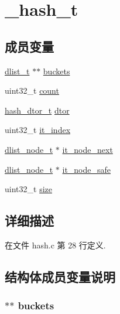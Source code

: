 \hypertarget{struct__hash__t}{}\section{\+\_\+hash\+\_\+t}
\label{struct__hash__t}
\subsection*{成员变量}
\begin{DoxyCompactItemize}
\item 
\hyperlink{config_8h_ad6644d67df4b4e3596c1eb12977d1d16}{dlist\+\_\+t} $\ast$$\ast$ \hyperlink{struct__hash__t_af6b48dd48b7299b532508d86de5dd4d2}{buckets}
\item 
uint32\+\_\+t \hyperlink{struct__hash__t_a86988a65e0d3ece7990c032c159786d6}{count}
\item 
\hyperlink{config_8h_a5dcd1ed9242185e4448352748e58573d}{hash\+\_\+dtor\+\_\+t} \hyperlink{struct__hash__t_a1d83dcf7c1891a605ea334819ac644fb}{dtor}
\item 
uint32\+\_\+t \hyperlink{struct__hash__t_a028bed28cdb43f02ee8bb330d2cc5653}{it\+\_\+index}
\item 
\hyperlink{config_8h_a62053232bcf3566010ef98a7d77c3cc8}{dlist\+\_\+node\+\_\+t} $\ast$ \hyperlink{struct__hash__t_a177625c1a4b1b746c710f82bf485fdb9}{it\+\_\+node\+\_\+next}
\item 
\hyperlink{config_8h_a62053232bcf3566010ef98a7d77c3cc8}{dlist\+\_\+node\+\_\+t} $\ast$ \hyperlink{struct__hash__t_a6dfec4a7073d96287c5b03b35862f10a}{it\+\_\+node\+\_\+safe}
\item 
uint32\+\_\+t \hyperlink{struct__hash__t_ab2c6b258f02add8fdf4cfc7c371dd772}{size}
\end{DoxyCompactItemize}


\subsection{详细描述}


在文件 hash.\+c 第 28 行定义.



\subsection{结构体成员变量说明}
\hypertarget{struct__hash__t_af6b48dd48b7299b532508d86de5dd4d2}{}
\subsubsection[{buckets}]{$\ast$$\ast$ buckets}\label{struct__hash__t_af6b48dd48b7299b532508d86de5dd4d2}


